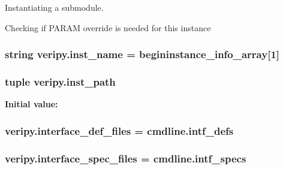 Instantiating a submodule. 

Checking if P\-A\-R\-A\-M override is needed for this instance \hypertarget{namespaceveripy_a7d88d1a02b6ed2027a623447589c4fcd}{
\subsubsection[{inst\-\_\-name}]{\setlength{\rightskip}{0pt plus 5cm}string veripy.\-inst\-\_\-name = {\bf begininstance\-\_\-info\-\_\-array}\mbox{[}1\mbox{]}}}\label{namespaceveripy_a7d88d1a02b6ed2027a623447589c4fcd}
\hypertarget{namespaceveripy_a5d77e0ab80b227fb0d6ea69a873da94c}{
\subsubsection[{inst\-\_\-path}]{\setlength{\rightskip}{0pt plus 5cm}tuple veripy.\-inst\-\_\-path}}\label{namespaceveripy_a5d77e0ab80b227fb0d6ea69a873da94c}
{\bfseries Initial value\-:}
\hypertarget{namespaceveripy_a60752cd883c2e6bcead5142e8c8b33c6}{
\subsubsection[{interface\-\_\-def\-\_\-files}]{\setlength{\rightskip}{0pt plus 5cm}veripy.\-interface\-\_\-def\-\_\-files = cmdline.\-intf\-\_\-defs}}\label{namespaceveripy_a60752cd883c2e6bcead5142e8c8b33c6}
\hypertarget{namespaceveripy_ab788939628a978e809745e050df2e8b6}{
\subsubsection[{interface\-\_\-spec\-\_\-files}]{\setlength{\rightskip}{0pt plus 5cm}veripy.\-interface\-\_\-spec\-\_\-files = cmdline.\-intf\-\_\-specs}}\label{namespaceveripy_ab788939628a978e809745e050df2e8b6}
